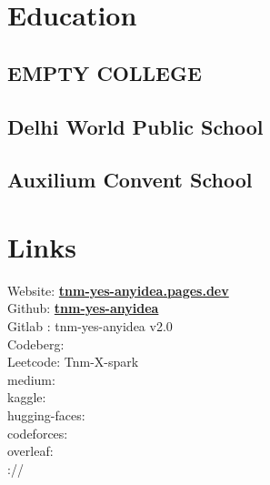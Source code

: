 \documentclass[]{deedy-resume-openfont}
\begin{document}
\lastupdated


\begin{minipage}[t]{0.33\textwidth}

\section{Education}

\subsection{EMPTY COLLEGE}
\sectionsep

\subsection{Delhi World Public School}
\sectionsep

\subsection{Auxilium Convent School}
\sectionsep

\section{Links}
Website:  \href{https://tnm-yes-anyidea.pages.dev/}{\bf tnm-yes-anyidea.pages.dev} \\
Github: \href{https://github.com/tnm-yes-anyidea}{\bf tnm-yes-anyidea} \\
Gitlab : \href{https://gitlab.com/tnm-yes-anyidea}{\bf} tnm-yes-anyidea v2.0 \\
Codeberg: \href{}{\bf} \\
Leetcode: \href{https://leetcode.com/u/Octavius_the_greatest/}{\bf} Tnm-X-spark\\
medium: \href{}{\bf} \\
kaggle: \href{}{\bf} \\
hugging-faces: \href{https://huggingface.co/willy-wonka5745}{\bf} \\
codeforces: \href{}{\bf} \\
overleaf: \href{}{\bf} \\
:// \href{}{\bf} \\


\end{minipage}
\end{document}

